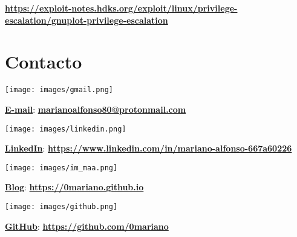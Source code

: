 \documentclass[a4paper]{article} %
\begin{document}
    \hspace{1cm}\href{https://exploit-notes.hdks.org/exploit/linux/privilege-escalation/gnuplot-privilege-escalation}{\textbf{\color{blue}https://exploit-notes.hdks.org/exploit/linux/privilege-escalation/gnuplot-privilege-escalation}}
    
\section{Contacto}

\begin{minipage}{0.05\textwidth}
  \texttt{[image: images/gmail.png]} 
\end{minipage}
\begin{minipage}{.7\textwidth}
    \vspace{1mm} %
    \href{mailto:marianoalfonso80@protonmail.com}{\textbf{\color{black}E-mail}}: \href{mailto:marianoalfonso80@protonmail.com}{\textbf{\color{blue}marianoalfonso80@protonmail.com}}
\end{minipage} 

\begin{minipage}{0.05\textwidth}
    \texttt{[image: images/linkedin.png]} 
\end{minipage}
\begin{minipage}{.7\textwidth}
    \vspace{1mm} %
    \href{https://www.linkedin.com/in/mariano-alfonso-667a60226}{\textbf{\color{black}LinkedIn}}: \href{https://www.linkedin.com/in/mariano-alfonso-667a60226}{\textbf{\color{blue}https://www.linkedin.com/in/mariano-alfonso-667a60226}}
\end{minipage} 

\begin{minipage}{0.05\textwidth}
    \texttt{[image: images/im\_maa.png]} 
\end{minipage}
\begin{minipage}{.7\textwidth}
    \vspace{1mm} %
    \href{https://0mariano.github.io}{\textbf{\color{black}Blog}}: \href{https://0mariano.github.io}{\textbf{\color{blue}https://0mariano.github.io}}
\end{minipage}

\begin{minipage}{0.05\textwidth}
    \texttt{[image: images/github.png]} 
\end{minipage}
\begin{minipage}{.7\textwidth}
    \vspace{1mm} %
    \href{https://github.com/0mariano}{\textbf{\color{black}GitHub}}: \href{https://github.com/0mariano}{\textbf{\color{blue}https://github.com/0mariano}}
\end{minipage}
\end{document}
